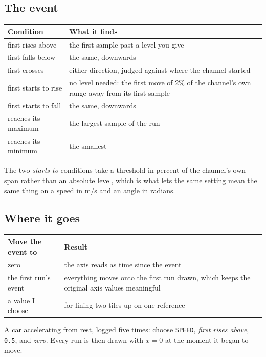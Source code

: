 \documentclass[11pt,a4paper,oneside]{report}
\newcommand{\code}[1]{\texttt{#1}}
\begin{document}
\subsection*{The event}

\begin{longtable}{@{}p{}p{}@{}}
\toprule
\textbf{Condition} & \textbf{What it finds} \\
\midrule
\endhead
first rises above & the first sample past a level you give \\
first falls below & the same, downwards \\
first crosses & either direction, judged against where the channel started \\
first starts to rise & no level needed: the first move of 2\% of the channel's
own range away from its first sample \\
first starts to fall & the same, downwards \\
reaches its maximum & the largest sample of the run \\
reaches its minimum & the smallest \\
\bottomrule
\end{longtable}

The two \emph{starts to} conditions take a threshold in percent of the
channel's own span rather than an absolute level, which is what lets the same
setting mean the same thing on a speed in m/s and an angle in radians.

\subsection*{Where it goes}

\begin{longtable}{@{}p{}p{}@{}}
\toprule
\textbf{Move the event to} & \textbf{Result} \\
\midrule
\endhead
zero & the axis reads as time since the event \\
the first run's event & everything moves onto the first run drawn, which keeps
the original axis values meaningful \\
a value I choose & for lining two tiles up on one reference \\
\bottomrule
\end{longtable}

A car accelerating from rest, logged five times: choose \code{SPEED},
\emph{first rises above}, \code{0.5}, and \emph{zero}. Every run is then drawn
with $x = 0$ at the moment it began to move.
\end{document}
